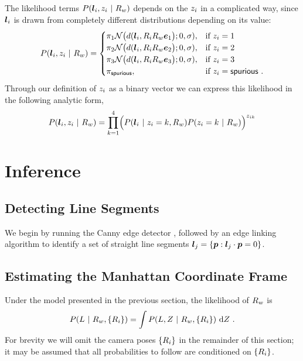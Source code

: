 The likelihood terms $P(\LineSeg_i,\Indicator_i ~|~ \SceneR)$ depends
on the $\Indicator_i$ in a complicated way, since $\LineSeg_i$ is
drawn from completely different distributions depending on its value:
\begin{equation}
  P(\LineSeg_i,\Indicator_i ~|~ \SceneR) =
  \begin{cases}
    \Mixing_1 
    \NormalDistr\bigr(\dist(\LineSeg_i, \CamR_i\SceneR\ex\bigl); 0,\sigma),
      & \mbox{if } \Indicator_i = 1 \\
    \Mixing_2
    \NormalDistr\bigr(\dist(\LineSeg_i, \CamR_i\SceneR\ey\bigl); 0,\sigma),
      & \mbox{if } \Indicator_i = 2 \\
    \Mixing_3
    \NormalDistr\bigr(\dist(\LineSeg_i, \CamR_i\SceneR\ez\bigl); 0,\sigma),
      & \mbox{if } \Indicator_i = 3 \\
    \Mixing_{\Spurious},
      & \mbox{if } \Indicator_i = \Spurious ~.
  \end{cases}
\end{equation}
Through our definition of $\Indicator_i$ as a binary vector we can
express this likelihood in the following analytic form,
\begin{equation}
  \label{eq:complete-likelihood}
  P(\LineSeg_i,\Indicator_i ~|~ \SceneR) =
  \prod_{k=1}^4 \Bigl( 
    P(\LineSeg_i ~|~ \Indicator_i=k,\SceneR)
    P(\Indicator_i=k ~|~ \SceneR)
  \Bigr)^{\Indicator_{ik}}
\end{equation}

\section{Inference}

\subsection{Detecting Line Segments}

We begin by running the Canny edge detector \cite{Canny86}, followed
by an edge linking algorithm \cite{Zhang02} to identify a set of
straight line segments $\LineSeg_j = \{\Pixel : \LineSeg_j\cdot\Pixel
= 0\}$.

\subsection{Estimating the Manhattan Coordinate Frame}

Under the model presented in the previous section, the
likelihood of $\SceneR$ is
\begin{equation}
  P(\LineSegs ~|~ \SceneR,\{\CamR_i\}) =
    \int P(\LineSegs,\Indicators ~|~ \SceneR,\{\CamR_i\})
    ~\intd\Indicators ~.
\end{equation}
For brevity we will omit the camera poses $\{\CamR_i\}$ in the
remainder of this section; it may be assumed that all probabilities
to follow are conditioned on $\{\CamR_i\}$.

